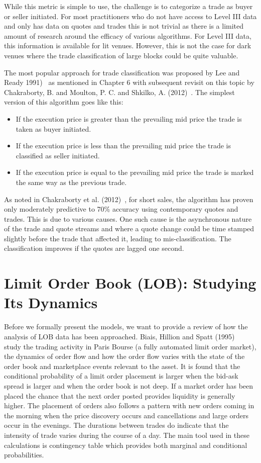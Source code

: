 While this metric is simple to use, the challenge is to categorize a trade as buyer or seller initiated. For most practitioners who do not have access to Level III data and only has data on quotes and trades this is not trivial as there is a limited amount of research around the efficacy of various algorithms. For Level III data, this information is available for lit venues. However, this is not the case for dark venues where the trade classification of large blocks could be quite valuable.


The most popular approach for trade classification was proposed by Lee and Ready 1991)~\cite{leeready} as mentioned in Chapter 6 with subsequent revisit on this topic by Chakraborty, B. and Moulton, P. C. and Shkilko, A. (2012)~\cite{chakrabarty2012short}. The simplest version of this algorithm goes like this:
        \begin{itemize}
        \item If the execution price is greater than the prevailing mid price the trade is taken as buyer initiated.
        \item If the execution price is less than the prevailing mid price the trade is classified as seller initiated.
        \item If the execution price is equal to the prevailing mid price the trade is marked the same way as the previous trade.
        \end{itemize}
As noted in Chakraborty et al. (2012)~\cite{chakrabarty2012short}, for short sales, the algorithm has proven only moderately predictive to 70\% accuracy using contemporary quotes and trades. This is due to various causes. One such cause is the asynchronous nature of the trade and quote streams and where a quote change could be time stamped slightly before the trade that affected it, leading to mis-classification. The classification improves if the quotes are lagged one second.



\section{Limit Order Book (LOB): Studying Its Dynamics}

Before we formally present the models, we want to provide a review of how the analysis of LOB data has been approached. Biais, Hillion and Spatt (1995)~\cite{spalt} study the trading activity in Paris Bourse (a fully automated limit order market), the dynamics of order flow and how the order flow varies with the state of the order book and marketplace events relevant to the asset. It is found that the conditional probability of a limit order placement is larger when the bid-ask spread is larger and when the order book is not deep. If a market order has been placed the chance that the next order posted provides liquidity is generally higher. The placement of orders also follows a pattern with new orders coming in the morning when the price discovery occurs and cancellations and large orders occur in the evenings. The durations between trades do indicate that the intensity of trade varies during the course of a day. The main tool used in these calculations is contingency table which provides both marginal and conditional probabilities. 


